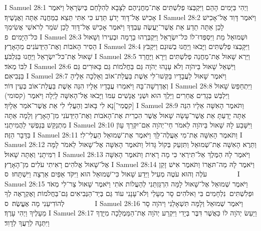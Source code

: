 I Samuel 28:1	וַיְהִי בַּיָּמִים הָהֵם וַיִּקְבְּצוּ פְלִשְׁתִּים אֶת־מַחֲנֵיהֶם לַצָּבָא לְהִלָּחֵם בְּיִשְׂרָאֵל וַיֹּאמֶר אָכִישׁ אֶל־דָּוִד יָדֹעַ תֵּדַע כִּי אִתִּי תֵּצֵא בַמַּחֲנֶה אַתָּה וַאֲנָשֶׁיךָ׃
I Samuel 28:2	וַיֹּאמֶר דָּוִד אֶל־אָכִישׁ לָכֵן אַתָּה תֵדַע אֵת אֲשֶׁר־יַעֲשֶׂה עַבְדֶּךָ וַיֹּאמֶר אָכִישׁ אֶל־דָּוִד לָכֵן שֹׁמֵר לְרֹאשִׁי אֲשִׂימְךָ כּל־הַיָּמִים׃ {פ}
I Samuel 28:3	וּשְׁמוּאֵל מֵת וַיִּסְפְּדוּ־לוֹ כּל־יִשְׂרָאֵל וַיִּקְבְּרֻהוּ בָרָמָה וּבְעִירוֹ וְשָׁאוּל הֵסִיר הָאֹבוֹת וְאֶת־הַיִּדְּעֹנִים מֵהָאָרֶץ׃
I Samuel 28:4	וַיִּקָּבְצוּ פְלִשְׁתִּים וַיָּבֹאוּ וַיַּחֲנוּ בְשׁוּנֵם וַיִּקְבֹּץ שָׁאוּל אֶת־כּל־יִשְׂרָאֵל וַיַּחֲנוּ בַּגִּלְבֹּעַ׃
I Samuel 28:5	וַיַּרְא שָׁאוּל אֶת־מַחֲנֵה פְלִשְׁתִּים וַיִּרָא וַיֶּחֱרַד לִבּוֹ מְאֹד׃
I Samuel 28:6	וַיִּשְׁאַל שָׁאוּל בַּיהֹוָה וְלֹא עָנָהוּ יְהֹוָה גַּם בַּחֲלֹמוֹת גַּם בָּאוּרִים גַּם בַּנְּבִיאִם׃
I Samuel 28:7	וַיֹּאמֶר שָׁאוּל לַעֲבָדָיו בַּקְּשׁוּ־לִי אֵשֶׁת בַּעֲלַת־אוֹב וְאֵלְכָה אֵלֶיהָ וְאֶדְרְשָׁה־בָּהּ וַיֹּאמְרוּ עֲבָדָיו אֵלָיו הִנֵּה אֵשֶׁת בַּעֲלַת־אוֹב בְּעֵין דּוֹר׃
I Samuel 28:8	וַיִּתְחַפֵּשׂ שָׁאוּל וַיִּלְבַּשׁ בְּגָדִים אֲחֵרִים וַיֵּלֶךְ הוּא וּשְׁנֵי אֲנָשִׁים עִמּוֹ וַיָּבֹאוּ אֶל־הָאִשָּׁה לָיְלָה וַיֹּאמֶר (קסומי) [קסֳמִי־]נָא לִי בָּאוֹב וְהַעֲלִי לִי אֵת אֲשֶׁר־אֹמַר אֵלָיִךְ׃
I Samuel 28:9	וַתֹּאמֶר הָאִשָּׁה אֵלָיו הִנֵּה אַתָּה יָדַעְתָּ אֵת אֲשֶׁר־עָשָׂה שָׁאוּל אֲשֶׁר הִכְרִית אֶת־הָאֹבוֹת וְאֶת־הַיִּדְּעֹנִי מִן־הָאָרֶץ וְלָמָה אַתָּה מִתְנַקֵּשׁ בְּנַפְשִׁי לַהֲמִיתֵנִי׃
I Samuel 28:10	וַיִּשָּׁבַע לָהּ שָׁאוּל בַּיהֹוָה לֵאמֹר חַי־יְהֹוָה אִם־יִקְּרֵךְ עָוֺן בַּדָּבָר הַזֶּה׃
I Samuel 28:11	וַתֹּאמֶר הָאִשָּׁה אֶת־מִי אַעֲלֶה־לָּךְ וַיֹּאמֶר אֶת־שְׁמוּאֵל הַעֲלִי־לִי׃
I Samuel 28:12	וַתֵּרֶא הָאִשָּׁה אֶת־שְׁמוּאֵל וַתִּזְעַק בְּקוֹל גָּדוֹל וַתֹּאמֶר הָאִשָּׁה אֶל־שָׁאוּל  לֵאמֹר לָמָּה רִמִּיתָנִי וְאַתָּה שָׁאוּל׃
I Samuel 28:13	וַיֹּאמֶר לָהּ הַמֶּלֶךְ אַל־תִּירְאִי כִּי מָה רָאִית וַתֹּאמֶר הָאִשָּׁה אֶל־שָׁאוּל אֱלֹהִים רָאִיתִי עֹלִים מִן־הָאָרֶץ׃
I Samuel 28:14	וַיֹּאמֶר לָהּ מַה־תּאֳרוֹ וַתֹּאמֶר אִישׁ זָקֵן עֹלֶה וְהוּא עֹטֶה מְעִיל וַיֵּדַע שָׁאוּל כִּי־שְׁמוּאֵל הוּא וַיִּקֹּד אַפַּיִם אַרְצָה וַיִּשְׁתָּחוּ׃ {ס}        
I Samuel 28:15	וַיֹּאמֶר שְׁמוּאֵל אֶל־שָׁאוּל לָמָּה הִרְגַּזְתַּנִי לְהַעֲלוֹת אֹתִי וַיֹּאמֶר שָׁאוּל צַר־לִי מְאֹד וּפְלִשְׁתִּים  נִלְחָמִים בִּי וֵאלֹהִים סָר מֵעָלַי וְלֹא־עָנָנִי עוֹד גַּם בְּיַד־הַנְּבִיאִים גַּם־בַּחֲלֹמוֹת וָאֶקְרָאֶה לְךָ לְהוֹדִיעֵנִי מָה אֶעֱשֶׂה׃ {ס}        
I Samuel 28:16	וַיֹּאמֶר שְׁמוּאֵל וְלָמָּה תִּשְׁאָלֵנִי וַיהֹוָה סָר מֵעָלֶיךָ וַיְהִי עָרֶךָ׃
I Samuel 28:17	וַיַּעַשׂ יְהֹוָה לוֹ כַּאֲשֶׁר דִּבֶּר בְּיָדִי וַיִּקְרַע יְהֹוָה אֶת־הַמַּמְלָכָה מִיָּדֶךָ וַיִּתְּנָהּ לְרֵעֲךָ לְדָוִד׃
